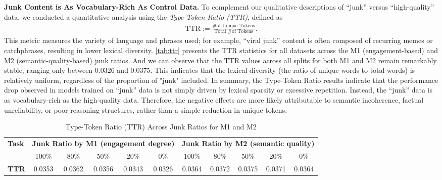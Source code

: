 \textbf{Junk Content is As Vocabulary-Rich As Control Data.}
To complement our qualitative descriptions of ``junk'' versus ``high-quality'' data, we conducted a quantitative analysis using the \textit{Type-Token Ratio (TTR)}, defined as
\begin{align*}
    \text{TTR} := \frac{\text{\# of Unique Tokens}}{\text{Total \# of Tokens}}.
\end{align*}
This metric measures the variety of language and phrases used; for example, ``viral junk'' content is often composed of recurring memes or catchphrases, resulting in lower lexical diversity.
\cref{tab:ttr} presents the TTR statistics for all datasets across the M1 (engagement-based) and M2 (semantic-quality-based) junk ratios. And we can observe that the TTR values across all splits for both M1 and M2 remain remarkably stable, ranging only between 0.0326 and 0.0375. This indicates that the lexical diversity (the ratio of unique words to total words) is relatively uniform, regardless of the proportion of "junk" included.
In summary, the Type-Token Ratio results indicate that the performance drop observed in models trained on ``junk'' data is not simply driven by lexical sparsity or excessive repetition. Instead, the ``junk'' data is as vocabulary-rich as the high-quality data. Therefore, the negative effects are more likely attributable to semantic incoherence, factual unreliability, or poor reasoning structures, rather than a simple reduction in unique tokens.

\begin{table}[h]
\centering
\footnotesize
\caption{Type-Token Ratio (TTR) Across Junk Ratios for M1 and M2}\label{tab:ttr}
\label{tab:ttr-stats}
\begin{tabular}{l
ccccc|ccccc}
\toprule
\multirow{2}{*}{\textbf{Task}}  
& \multicolumn{5}{c|}{\textbf{Junk Ratio by M1 (engagement degree)}} 
& \multicolumn{5}{c}{\textbf{Junk Ratio by M2 (semantic quality)}} 
\\
& 100\% & 80\% & 50\% & 20\% & 0\%
& 100\% & 80\% & 50\% & 20\% & 0\%
\\
\midrule
\textbf{TTR} 
& 0.0353 & 0.0362 & 0.0356 & 0.0343 & 0.0326
& 0.0364 & 0.0372 & 0.0375 & 0.0371 & 0.0364
\\
\bottomrule
\end{tabular}
\end{table}







